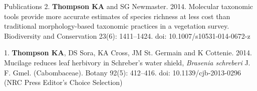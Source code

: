 \documentclass[12pt]{article}
\begin{document}
\begin{rSection}{Publications}
\noindent\hspace{.1cm}2. \textbf{Thompson KA} and SG Newmaster. 2014. Molecular taxonomic tools provide more accurate estimates of species richness at less cost than traditional morphology-based taxonomic practices in a vegetation survey. Biodiversity and Conservation 23(6): 1411–1424. doi: 10.1007/s10531-014-0672-z

\noindent\hspace{.1cm}1. \textbf{Thompson KA}, DS Sora, KA Cross, JM St. Germain and K Cottenie. 2014. Mucilage reduces leaf herbivory in Schreber’s water shield, \textit{Brasenia schreberi} J. F. Gmel. (Cabombaceae). Botany 92(5): 412–416. doi: 10.1139/cjb-2013-0296
(NRC Press Editor’s Choice Selection)

\vspace{0.5em} %


\end{rSection}
\end{document}
